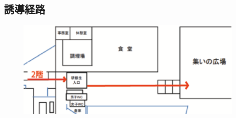 \subsection{誘導経路}
\begin{figure}[H]
\begin{center}
  \includegraphics[scale=0.6]{./17/asanozu.eps}
\end{center}
\end{figure}





%
